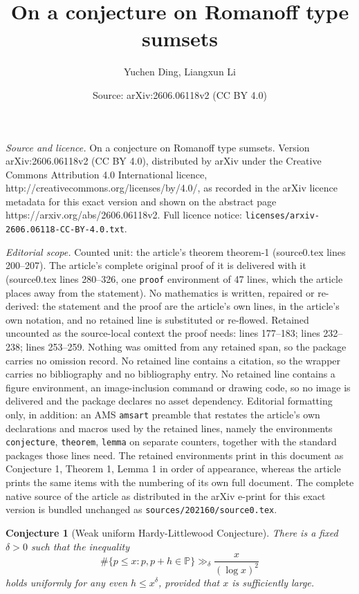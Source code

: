 \documentclass[10pt,a4paper]{amsart}
\title{On a conjecture on Romanoff type sumsets}
\author{Yuchen Ding, Liangxun Li}
\date{Source: arXiv:2606.06118v2 (CC BY 4.0)}
\newtheorem{conjecture}{Conjecture}
\begin{document}
\maketitle

\noindent\emph{Source and licence.} On a conjecture on Romanoff type sumsets. Version arXiv:2606.06118v2 (CC BY 4.0), distributed by arXiv under the Creative Commons Attribution 4.0 International licence, http://creativecommons.org/licenses/by/4.0/, as recorded in the arXiv licence metadata for this exact version and shown on the abstract page https://arxiv.org/abs/2606.06118v2. Full licence notice: \texttt{licenses/arxiv-2606.06118-CC-BY-4.0.txt}.\par\smallskip

\noindent\textit{Editorial scope.} Counted unit: the article's theorem theorem-1 (source0.tex lines 200--207). The article's complete original proof of it is delivered with it (source0.tex lines 280--326, one \texttt{proof} environment of 47 lines, which the article places away from the statement). No mathematics is written, repaired or re-derived: the statement and the proof are the article's own lines, in the article's own notation, and no retained line is substituted or re-flowed.  Retained uncounted as the source-local context the proof needs: lines 177--183; lines 232--238; lines 253--259.  Nothing was omitted from any retained span, so the package carries no omission record.  No retained line contains a citation, so the wrapper carries no bibliography and no bibliography entry.  No retained line contains a figure environment, an image-inclusion command or drawing code, so no image is delivered and the package declares no asset dependency.  Editorial formatting only, in addition: an AMS \texttt{amsart} preamble that restates the article's own declarations and macros used by the retained lines, namely the environments \texttt{conjecture}, \texttt{theorem}, \texttt{lemma} on separate counters, together with the standard packages those lines need.  The retained environments print in this document as Conjecture 1, Theorem 1, Lemma 1 in order of appearance, whereas the article prints the same items with the numbering of its own full document.  The complete native source of the article as distributed in the arXiv e-print for this exact version is bundled unchanged as \texttt{sources/202160/source0.tex}.
\begin{conjecture}[Weak uniform Hardy-Littlewood Conjecture]\label{conjecture-2}
There is a fixed $\delta>0$ such that the inequality
$$
\#\big\{p\le x: p, p+h\in \mathbb{P}\big\}\gg_\delta \frac{x}{(\log x)^2}
$$
holds uniformly for any even $h\le x^\delta$, provided that $x$ is sufficiently large.
\end{conjecture}
\end{document}
